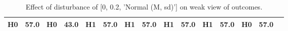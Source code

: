 \begin{table}
\begin{tabular}{l|cc|cc|cc|cc|cc|cc|cc}
\cellcolor{Bittersweet}H0&\cellcolor{Bittersweet}57.0&\cellcolor{Bittersweet}H0&\cellcolor{Bittersweet}43.0&\cellcolor{Bittersweet}H1&\cellcolor{Bittersweet}57.0&\cellcolor{Bittersweet}H1&\cellcolor{Bittersweet}57.0&\cellcolor{Bittersweet}H1&\cellcolor{Bittersweet}57.0&\cellcolor{Bittersweet}H1&\cellcolor{Bittersweet}57.0&\cellcolor{Bittersweet}H0&\cellcolor{Bittersweet}57.0\\\bottomrule\end{tabular}\caption{Effect of disturbance of [0, 0.2, 'Normal (M, sd)'] on weak view of outcomes.}\end{table}